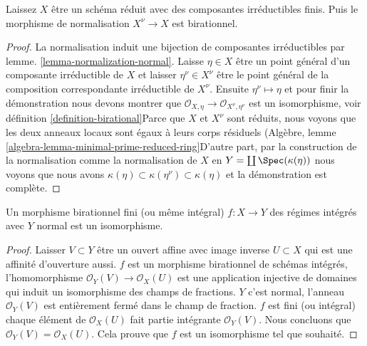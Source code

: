\begin{lemma}

\label{lemma-normalization-birational}
Laissez $X$ être un schéma réduit avec des composantes irréductibles finis. Puis le morphisme de normalisation $X^\nu \to X$ est birationnel.
\end{lemma}

\begin{proof}

La normalisation induit une bijection de composantes irréductibles par lemme. \ref{lemma-normalization-normal}. Laisse $\eta \in X$ être un point général d'un composante irréductible de $X$ et laisser $\eta^\nu \in X^\nu$
être le point général de la composition correspondante irréductible de $X^\nu$. Ensuite $\eta^\nu \mapsto \eta$ et pour finir la démonstration nous devons montrer que
$\mathcal{O}_{X, \eta} \to \mathcal{O}_{X^\nu, \eta^\nu}$
est un isomorphisme, voir définition \ref{definition-birational}Parce que $X$ et $X^\nu$ sont réduits, nous voyons que les deux anneaux locaux sont égaux à leurs corps résiduels (Algèbre, lemme \ref{algebra-lemma-minimal-prime-reduced-ring}D'autre part, par la construction de la normalisation comme la normalisation de $X$ en $Y = \coprod \Spec(\kappa(\eta))$
nous voyons que nous avons
$\kappa(\eta) \subset \kappa(\eta^\nu) \subset \kappa(\eta)$
et la démonstration est complète.

\end{proof}

\begin{lemma}

\label{lemma-finite-birational-over-normal}

Un morphisme birationnel fini (ou même intégral) $f : X \to Y$
des régimes intégrés avec $Y$ normal est un isomorphisme.

\end{lemma}

\begin{proof}

Laisser $V \subset Y$ être un ouvert affine avec image inverse $U \subset X$ qui est une affinité d'ouverture aussi. $f$ est un morphisme birationnel de schémas intégrés, l'homomorphisme
$\mathcal{O}_Y(V) \to \mathcal{O}_X(U)$ est une application injective de domaines qui induit un isomorphisme des champs de fractions. $Y$ c'est normal, l'anneau $\mathcal{O}_Y(V)$ est entièrement fermé dans le champ de fraction. $f$ est fini (ou intégral) chaque élément de $\mathcal{O}_X(U)$
fait partie intégrante $\mathcal{O}_Y(V)$. Nous concluons que
$\mathcal{O}_Y(V) = \mathcal{O}_X(U)$. Cela prouve que $f$ est un isomorphisme tel que souhaité.

\end{proof}


